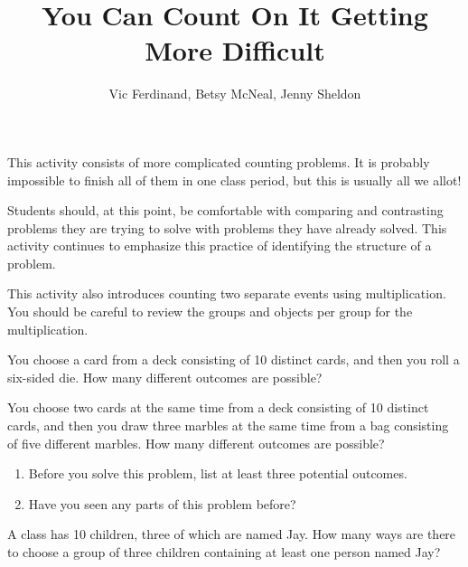 \documentclass{ximera}
\title{You Can Count On It Getting More Difficult}
\author{Vic Ferdinand, Betsy McNeal, Jenny Sheldon}
\begin{document}
\begin{abstract}
\end{abstract}
\maketitle

\begin{instructorIntro}
This activity consists of more complicated counting problems.  It is probably impossible to finish all of them in one class period, but this is usually all we allot!

Students should, at this point, be comfortable with comparing and contrasting problems they are trying to solve with problems they have already solved.  This activity continues to emphasize this practice of identifying the structure of a problem.

This activity also introduces counting two separate events using multiplication.  You should be careful to review the groups and objects per group for the multiplication.
\end{instructorIntro}



\begin{problem}
You choose a card from a deck consisting of 10 distinct cards, and then you roll a six-sided die.  How many different outcomes are possible?
\end{problem}

\begin{problem}
You choose two cards at the same time from a deck consisting of 10 distinct cards, and then you draw three marbles at the same time from a bag consisting of five different marbles.  How many different outcomes are possible?
\begin{enumerate}
\item Before you solve this problem, list at least three potential outcomes.
\item Have you seen any parts of this problem before?
\end{enumerate}
\end{problem}

\begin{problem}
A class has 10 children, three of which are named Jay.  How many ways are there to choose a group of three children containing at least one person named Jay?
\end{problem}
\end{document}
